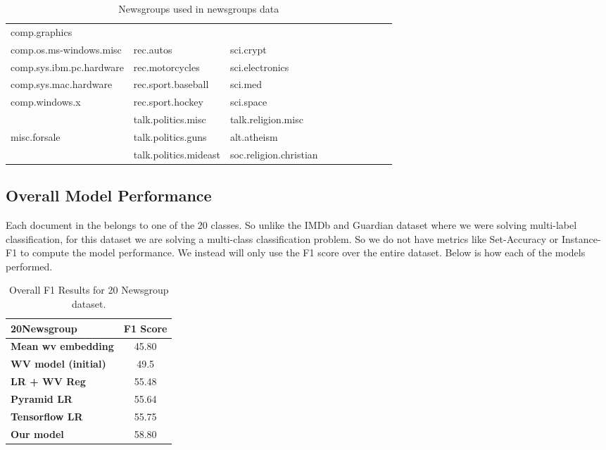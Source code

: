 \begin{table}[htbp]
\begin{tabular}{|l|l|l|lllllll}
\cline{1-3}
comp.graphics            &                       &                        &  &  &  &  &  &  &  \\
comp.os.ms-windows.misc  & rec.autos             & sci.crypt              &  &  &  &  &  &  &  \\
comp.sys.ibm.pc.hardware & rec.motorcycles       & sci.electronics        &  &  &  &  &  &  &  \\
comp.sys.mac.hardware    & rec.sport.baseball    & sci.med                &  &  &  &  &  &  &  \\
comp.windows.x           & rec.sport.hockey      & sci.space              &  &  &  &  &  &  &  \\ \cline{1-3}
                         & talk.politics.misc    & talk.religion.misc     &  &  &  &  &  &  &  \\
misc.forsale             & talk.politics.guns    & alt.atheism            &  &  &  &  &  &  &  \\
                         & talk.politics.mideast & soc.religion.christian &  &  &  &  &  &  &  \\ \cline{1-3}
\end{tabular}
\caption{\label{tab:widgets}Newsgroups used in newsgroups data}
\end{table}

\subsection{Overall Model Performance}

Each document in the belongs to one of the 20 classes. So unlike the IMDb and Guardian dataset where we were solving multi-label classification, for this dataset we are solving a multi-class classification problem. So we do not have metrics like Set-Accuracy or Instance-F1 to compute the model performance. We instead will only use the F1 score over the entire dataset. Below is how each of the models performed.

\begin{table}[htbp]
\centering
\begin{tabular}{l|c}
20Newsgroup & \textbf{F1 Score} \\ \hline
\textbf{Mean wv embedding} & 45.80 \\
\textbf{WV model (initial)} & 49.5 \\
\textbf{LR + WV Reg} & 55.48 \\
\textbf{Pyramid LR} & 55.64 \\
\textbf{Tensorflow LR} & 55.75 \\
\textbf{Our model} & 58.80
\end{tabular}
\caption{\label{tab:widgets}Overall F1 Results for 20 Newsgroup dataset.}
\end{table}

